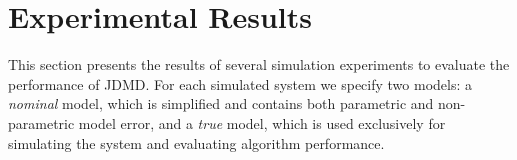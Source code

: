 \documentclass[../root.tex]{subfiles}
\begin{document}

\section{Experimental Results} \label{sec:results}

This section presents the results of several simulation experiments to evaluate the
performance of JDMD.  For each simulated system we specify two models: a \textit{nominal}
model, which is simplified and contains both parametric and non-parametric model error, and
a \textit{true} model, which is used exclusively for simulating the system and evaluating
algorithm performance.
\end{document}
